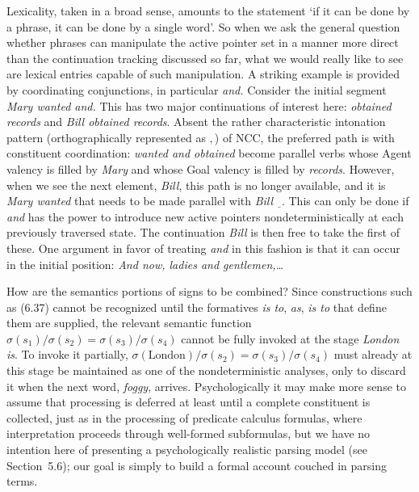 Lexicality, taken in a broad sense, amounts to the statement `if it can be
done by a phrase, it can be done by a single word'. So when we ask the general
question whether phrases can manipulate the active pointer set in a manner
more direct than the continuation tracking discussed so far, what we would
really like to see are lexical entries capable of such manipulation.  A
striking example is provided by coordinating conjunctions, in particular {\it
  and.} Consider the initial segment {\it Mary wanted and.} This has two major
continuations of interest here: {\it obtained records} and {\it Bill obtained
  records}. Absent the rather characteristic intonation pattern
(orthographically represented as $,$) of NCC, the preferred path is with
constituent coordination: {\it wanted and obtained} become parallel verbs
whose Agent valency is filled by {\it Mary} and whose Goal valency is filled
by {\it records}. However, when we see the next element, {\it Bill}, this path
is no longer available, and it is {\it Mary wanted} that needs to be made
parallel with {\it Bill } $\underline{\ \ }$. This can only be done if {\it
  and} has the power to introduce new active pointers nondeterministically at
each previously traversed state. The continuation {\it Bill} is then free to
take the first of these. One argument in favor of treating {\it and} in this
fashion is that it can occur in the initial position: {\it And now, ladies and
  gentlemen,\ldots}

How are the semantics portions of signs to be combined?  Since constructions
such as (6.37) cannot be recognized until the formatives {\it is to}, {\it
  as}, {\it is to} that define them are supplied, the relevant semantic
function $\sigma(s_1)/\sigma(s_2)= \sigma(s_3)/\sigma(s_4)$ cannot be fully
invoked at the stage {\it London is}. To invoke it partially,
$\sigma(\text{London})/\sigma(s_2)= \sigma(s_3)/\sigma(s_4)$ must already at
this stage be maintained as one of the nondeterministic analyses, only to
discard it when the next word, {\it foggy}, arrives.  Psychologically it may
make more sense to assume that processing is deferred at least until a
complete constituent is collected, just as in the processing of predicate
calculus formulas, where interpretation proceeds through well-formed
subformulas, but we have no intention here of presenting a psychologically
realistic parsing model (see Section~5.6); our goal is simply to build a
formal account couched in parsing terms.

